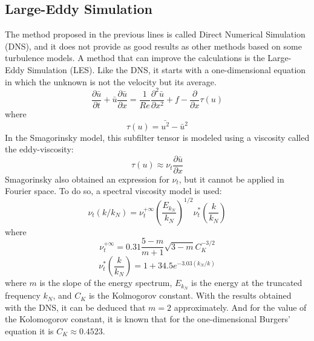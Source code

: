 \subsection{Large-Eddy Simulation}
The method proposed in the previous lines is called Direct Numerical Simulation (DNS), and it does not provide as good results as other methods based on some turbulence models. A method that can improve the calculations is the Large-Eddy Simulation (LES). Like the DNS, it starts with a one-dimensional equation in which the unknown is not the velocity but its average.
\begin{equation}
\frac{\partial\bar{u}}{\partial t}+\bar{u}\frac{\partial\bar{u}}{\partial x}=\frac{1}{Re}\frac{\partial^{2}\bar{u}}{\partial x^{2}}+f-\frac{\partial}{\partial x}\tau\left(u\right)
\end{equation}
where
\begin{equation}
\tau\left(u\right)=\bar{u^{2}}-\bar{u}^{2}
\end{equation}
In the Smagorinsky model, this subfilter tensor is modeled using a viscosity called the eddy-viscosity:
\begin{equation}
\tau\left(u\right)\approx\nu_{t}\frac{\partial\bar{u}}{\partial x}
\end{equation}
Smagorinsky also obtained an expression for $\nu_{t}$, but it cannot be applied in Fourier space. To do so, a spectral viscosity model is used:
\begin{equation}
\nu_{t}\left(k/k_{N}\right)=\nu_{t}^{+\infty}\left(\frac{E_{k_{N}}}{k_{N}}\right)^{1/2}\nu_{t}^{*}\left(\frac{k}{k_N}\right)
\end{equation}
where
\begin{equation}
\nu_{t}^{+\infty}=0.31\frac{5-m}{m+1}\sqrt{3-m}C_{K}^{-3/2}
\end{equation}
\begin{equation}
\nu_{t}^{*}\left(\frac{k}{k_{N}}\right)=1+34.5e^{-3.03\left(k_N/k\right)}
\end{equation}
where $m$ is the slope of the energy spectrum, $E_{k_{N}}$ is the energy at the truncated frequency $k_{N}$, and $C_{K}$ is the Kolmogorov constant. With the results obtained with the DNS, it can be deduced that $m=2$ approximately. And for the value of the Kolomogorov constant, it is known that for the one-dimensional Burgers' equation it is $C_{K}\approx0.4523$.